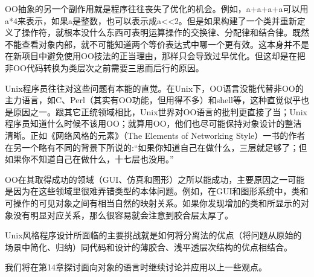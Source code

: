 \documentclass[12pt,oneside]{book}
\begin{document}
OO抽象的另一个副作用就是程序往往丧失了优化的机会。例如，a+a+a+a可以用a*4来表示，如果a是整数，也可以表示成a<<2。但是如果构建了一个类并重新定义了操作符，就根本没什么东西可表明运算操作的交换律、分配律和结合律。既然不能查看对象内部，就不可能知道两个等价表达式中哪一个更有效。这本身并不是在新项目中避免使用OO技法的正当理由，那样只会导致过早优化。但这却是在把非OO代码转换为类层次之前需要三思而后行的原因。

Unix程序员往往对这些问题有本能的直觉。在Unix下，OO语言没能代替非OO的主力语言，如C、Perl（其实有OO功能，但用得不多）和shell等，这种直觉似乎也是原因之一。跟其它正统领域相比，Unix世界对OO语言的批判更直接了当；Unix程序员知道什么时候不该用OO；就算用OO，他们也尽可能保持对象设计的整洁清晰。正如《网络风格的元素》（The Elements of Networking Style）一书的作者在另一个略有不同的背景下所说的\cite{Padlipsky}:“如果你知道自己在做什么，三层就足够了；但如果你不知道自己在做什么，十七层也没用。”

OO在其取得成功的领域（GUI、仿真和图形）之所以能成功，主要原因之一可能是因为在这些领域里很难弄错类型的本体问题。例如，在GUI和图形系统中，类和可操作的可见对象之间有相当自然的映射关系。如果你发现增加的类和所显示的对象没有明显对应关系，那么很容易就会注意到胶合层太厚了。

Unix风格程序设计所面临的主要挑战就是如何将分离法的优点（将问题从原始的场景中简化、归纳）同代码和设计的薄胶合、浅平透层次结构的优点相结合。

我们将在第14章探讨面向对象的语言时继续讨论并应用以上一些观点。
\end{document}

